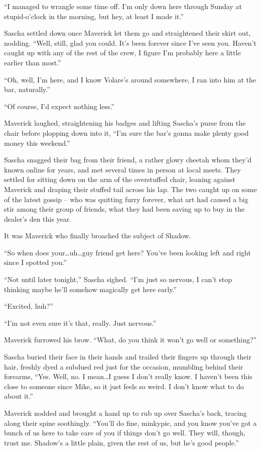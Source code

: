 \documentclass[12pt,letterpaper,oneside]{memoir}
\begin{document}
  ``I managed to wrangle some time off. I'm only down here through Sunday at stupid-o'clock in the morning, but hey, at least I made it.''

  Sascha settled down once Maverick let them go and straightened their skirt out, nodding. ``Well, still, glad you could. It's been forever since I've seen you. Haven't caught up with any of the rest of the crew, I figure I'm probably here a little earlier than most.''

  ``Oh, well, I'm here, and I know Volare's around somewhere, I ran into him at the bar, naturally.''

  ``Of course, I'd expect nothing less.''

  Maverick laughed, straightening his badges and lifting Sascha's purse from the chair before plopping down into it, ``I'm sure the bar's gonna make plenty good money this weekend.''

  Sascha snagged their bag from their friend, a rather glowy cheetah whom they'd known online for years, and met several times in person at local meets. They settled for sitting down on the arm of the overstuffed chair, leaning against Maverick and draping their stuffed tail across his lap. The two caught up on some of the latest gossip -- who was quitting furry forever, what art had caused a big stir among their group of friends, what they had been saving up to buy in the dealer's den this year.

  It was Maverick who finally broached the subject of Shadow.

  ``So when does your\ldots{}uh\ldots{}guy friend get here? You've been looking left and right since I spotted you.''

  ``Not until later tonight,'' Sascha sighed. ``I'm just so nervous, I can't stop thinking maybe he'll somehow magically get here early.''

  ``Excited, huh?''

  ``I'm not even sure it's that, really. Just nervous.''

  Maverick furrowed his brow. ``What, do you think it won't go well or something?''

  Sascha buried their face in their hands and trailed their fingers up through their hair, freshly dyed a subdued red just for the occasion, mumbling behind their forearms, ``Yes. Well, no. I mean\ldots{}I guess I don't really know. I haven't been this close to someone since Mike, so it just feels so weird. I don't know what to do about it.''

  Maverick nodded and brought a hand up to rub up over Sascha's back, tracing along their spine soothingly. ``You'll do fine, minkypie, and you know you've got a bunch of us here to take care of you if things don't go well. They will, though, trust me. Shadow's a little plain, given the rest of us, but he's good people.''
\end{document}
